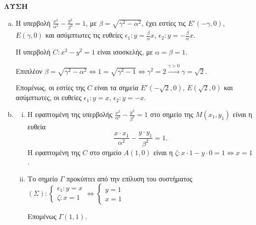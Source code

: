 \textbf{ΛΥΣΗ}

\begin{enumerate}[a)]
    \item Η υπερβολή $\frac{x^2}{\alpha^2} - \frac{y^2}{\beta^2} = 1$, με $\beta = \sqrt{\gamma^2 - \alpha^2}$, έχει εστίες τις $E'(-\gamma,0)$, $E(\gamma,0)$ και ασύμπτωτες τις ευθείες $\epsilon_1: y = \frac{\beta}{\alpha}x$, $\epsilon_2: y = -\frac{\beta}{\alpha}x$.
    
    Η υπερβολή $C: x^2 - y^2 = 1$ είναι ισοσκελής, με $\alpha = \beta = 1$.
    
    Επιπλέον $\beta = \sqrt{\gamma^2 - \alpha^2} \Leftrightarrow 1 = \sqrt{\gamma^2 - 1} \Leftrightarrow \gamma^2 = 2 \xrightarrow{\gamma>0} \gamma = \sqrt{2}$.
    
    Επομένως, οι εστίες της $C$ είναι τα σημεία $E'(-\sqrt{2},0)$, $E(\sqrt{2},0)$ και ασύμπτωτες, οι ευθείες $\epsilon_1: y = x$, $\epsilon_2: y = -x$.

    \item 
    \begin{enumerate}[i)]
        \item Η εφαπτομένη της υπερβολής $\frac{x^2}{\alpha^2} - \frac{y^2}{\beta^2} = 1$ στο σημείο της $M(x_1,y_1)$ είναι η ευθεία
        \[ \frac{x \cdot x_1}{\alpha^2} - \frac{y \cdot y_1}{\beta^2} = 1. \]
        Η εφαπτομένη της $C$ στο σημείο $A(1,0)$ είναι η $\zeta: x \cdot 1 - y \cdot 0 = 1 \Leftrightarrow x = 1$.

        \item Το σημείο $\Gamma$ προκύπτει από την επίλυση του συστήματος $(\Sigma): \begin{cases} \epsilon_1: y = x \\ \zeta: x = 1 \end{cases} \Leftrightarrow \begin{cases} y = 1 \\ x = 1 \end{cases}$
        
        Επομένως $\Gamma(1,1)$.
    \end{enumerate}
\end{enumerate}